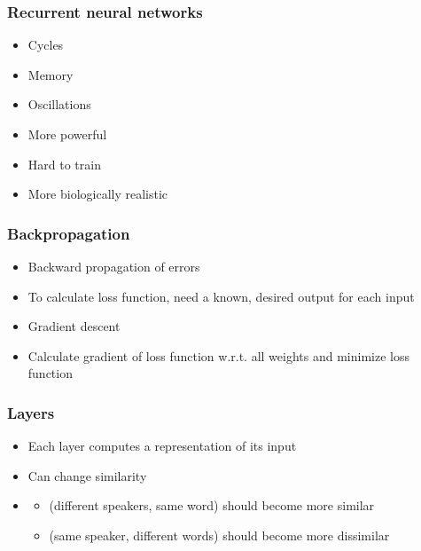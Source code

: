 \begin{frame}
  \frametitle{Recurrent neural networks}
  \begin{itemize}
  \item Cycles
  \item Memory
  \item Oscillations
  \item More powerful
  \item Hard to train 
  \item More biologically realistic
  \end{itemize}
\end{frame}

\begin{frame}
  \frametitle{Backpropagation}
  \begin{itemize}
  \item Backward propagation of errors
  \item To calculate loss function, need a known, desired output for each input
  \item Gradient descent
  \item Calculate gradient of loss function w.r.t. all weights and
    minimize loss function
  \end{itemize}

\end{frame}

\begin{frame}
  \frametitle{Layers}
  \begin{itemize}
  \item Each layer computes a representation of its input
  \item Can change similarity
  \item<2-> 
    \begin{itemize}
    \item (different speakers, same word) should become more similar
    \item (same speaker, different words) should
      become more dissimilar
    \end{itemize}
  \end{itemize}
\end{frame}


